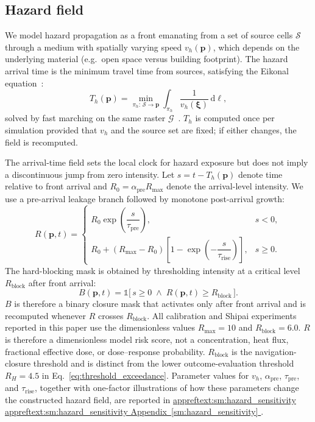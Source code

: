 \documentclass[preprint,12pt]{elsarticle}
\providecommand{\FloatBarrier}{}
\let\origsubsection\subsection
\renewcommand{\subsection}{\FloatBarrier\origsubsection}
\DeclareRobustCommand{\appref}[1]{%
  \hyperref[#1]{%
    \ifcsname appreftext:#1\endcsname%
      \csname appreftext:#1\endcsname%
    \else%
      Appendix~\ref*{#1}%
    \fi%
  }%
}
\begin{document}
\subsection{Hazard field}
\label{sec:hazard_field}

We model hazard propagation as a front emanating from a set of source
cells $\mathcal{S}$ through a medium with spatially varying speed
$v_h(\mathbf{p})$, which depends on the underlying material (e.g.\ open
space versus building footprint). The hazard arrival time is the minimum
travel time from sources, satisfying the Eikonal
equation~\citep{Sethian1996FastMarching}:
\begin{equation}
T_h(\mathbf{p}) = \min_{\pi_h:\, \mathcal{S} \to \mathbf{p}}
\int_{\pi_h} \frac{1}{v_h(\boldsymbol{\xi})}\,\mathrm{d}\ell,
\label{eq:hazard_arrival}
\end{equation}
solved by fast marching on the same raster
$\mathcal{G}$~\citep{Sethian1996FastMarching,Zhao2005FastSweeping}.
$T_h$ is computed once per simulation provided that $v_h$ and the source
set are fixed; if either changes, the field is recomputed.

The arrival-time field sets the local clock for hazard exposure but does
not imply a discontinuous jump from zero intensity. Let
$s=t-T_h(\mathbf{p})$ denote time relative to front arrival and
$R_0=\alpha_{\mathrm{pre}}R_{\max}$ denote the arrival-level intensity.
We use a pre-arrival leakage branch followed by monotone post-arrival
growth:
\begin{equation}
R(\mathbf{p}, t) =
\begin{cases}
R_0 \exp\!\left(\dfrac{s}{\tau_{\mathrm{pre}}}\right), & s < 0,\\[5pt]
R_0 + (R_{\max}-R_0)
\left[1-\exp\!\left(-\dfrac{s}{\tau_{\mathrm{rise}}}\right)\right],
& s \ge 0.
\end{cases}
\label{eq:hazard_intensity}
\end{equation}
The hard-blocking mask is obtained by thresholding intensity at a
critical level $R_{\mathrm{block}}$ after front arrival:
\begin{equation}
B(\mathbf{p}, t)
= \mathbb{1}\!\big[\, s \ge 0 \;\wedge\;
R(\mathbf{p}, t) \ge R_{\mathrm{block}} \,\big].
\label{eq:hazard_blocking}
\end{equation}
$B$ is therefore a binary closure mask that activates only after front
arrival and is recomputed whenever $R$ crosses $R_{\mathrm{block}}$.
All calibration and Shipai experiments reported in this paper use the
dimensionless values $R_{\max}=10$ and $R_{\mathrm{block}}=6.0$.
$R$ is therefore a dimensionless model risk score, not a concentration,
heat flux, fractional effective dose, or dose--response probability.
$R_{\mathrm{block}}$ is the navigation-closure threshold and is distinct
from the lower outcome-evaluation threshold $R_H=4.5$ in
Eq.~\eqref{eq:threshold_exceedance}. Parameter values for $v_h$,
$\alpha_{\mathrm{pre}}$, $\tau_{\mathrm{pre}}$, and
$\tau_{\mathrm{rise}}$, together with one-factor illustrations of how
these parameters change the constructed hazard field, are reported in
\appref{sm:hazard_sensitivity}.
\end{document}
